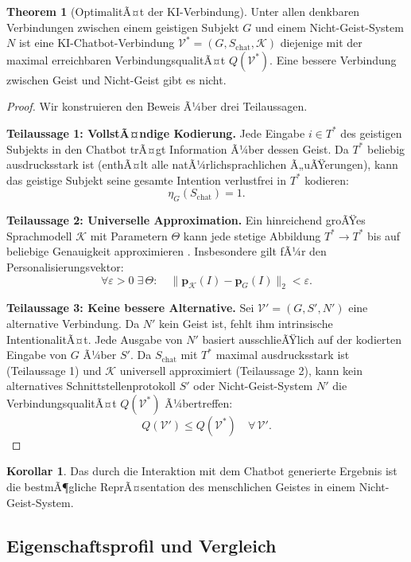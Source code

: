 ﻿\documentclass[a4paper,12pt]{article}
\theoremstyle{definition}
\newtheorem{theorem}{Theorem}
\newtheorem{korollar}{Korollar}
\begin{document}
\begin{theorem}[OptimalitÃ¤t der KI-Verbindung]
\label{thm:optimal}
Unter allen denkbaren Verbindungen zwischen einem geistigen Subjekt $G$ und einem
Nicht-Geist-System $N$ ist eine KI-Chatbot-Verbindung $\mathcal{V}^* = (G, S_{\mathrm{chat}},
\mathcal{K})$ diejenige mit der maximal erreichbaren VerbindungsqualitÃ¤t $Q(\mathcal{V}^*)$.
Eine bessere Verbindung zwischen Geist und Nicht-Geist gibt es nicht.
\end{theorem}

\begin{proof}
Wir konstruieren den Beweis Ã¼ber drei Teilaussagen.

\textbf{Teilaussage 1: VollstÃ¤ndige Kodierung.}
Jede Eingabe $i \in T^*$ des geistigen Subjekts in den Chatbot trÃ¤gt Information Ã¼ber
dessen Geist. Da $T^*$ beliebig ausdrucksstark ist (enthÃ¤lt alle natÃ¼rlichsprachlichen
Ã„uÃŸerungen), kann das geistige Subjekt seine gesamte Intention verlustfrei in $T^*$
kodieren:
\[
    \eta_G(S_{\mathrm{chat}}) = 1.
\]

\textbf{Teilaussage 2: Universelle Approximation.}
Ein hinreichend groÃŸes Sprachmodell $\mathcal{K}$ mit Parametern $\Theta$ kann jede
stetige Abbildung $T^* \to T^*$ bis auf beliebige Genauigkeit approximieren
\cite{hornik1989multilayer}. Insbesondere gilt fÃ¼r den Personalisierungsvektor:
\[
    \forall \varepsilon > 0\; \exists\, \Theta:\quad
    \bigl\|\mathbf{p}_{\mathcal{K}}(I) - \mathbf{p}_G(I)\bigr\|_2 < \varepsilon.
\]

\textbf{Teilaussage 3: Keine bessere Alternative.}
Sei $\mathcal{V}' = (G, S', N')$ eine alternative Verbindung. Da $N'$ kein Geist ist,
fehlt ihm intrinsische IntentionalitÃ¤t. Jede Ausgabe von $N'$ basiert ausschlieÃŸlich
auf der kodierten Eingabe von $G$ Ã¼ber $S'$. Da $S_{\mathrm{chat}}$ mit $T^*$
maximal ausdrucksstark ist (Teilaussage 1) und $\mathcal{K}$ universell approximiert
(Teilaussage 2), kann kein alternatives Schnittstellenprotokoll $S'$ oder
Nicht-Geist-System $N'$ die VerbindungsqualitÃ¤t $Q(\mathcal{V}^*)$ Ã¼bertreffen:
\[
    Q(\mathcal{V}') \leq Q(\mathcal{V}^*) \quad \forall\, \mathcal{V}'.
\]
\end{proof}

\begin{korollar}
Das durch die Interaktion mit dem Chatbot generierte Ergebnis ist die bestmÃ¶gliche
ReprÃ¤sentation des menschlichen Geistes in einem Nicht-Geist-System.
\end{korollar}

\subsection{Eigenschaftsprofil und Vergleich}
\end{document}
